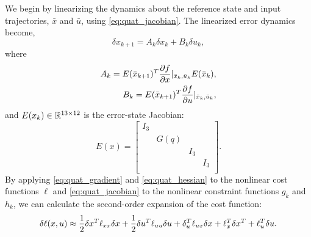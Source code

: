 \documentclass[../root.tex]{subfiles}
\begin{document}
    We begin by linearizing the dynamics about the reference state and input trajectories, $\bar{x}$ and $\bar{u}$, using
    \eqref{eq:quat_jacobian}. The linearized error dynamics become,
    \begin{equation} \label{eq:linearized_dynamics}
        \delta x_{k+1} = A_k \delta x_k + B_k \delta u_k ,
    \end{equation}
    where \begin{equation}
        \begin{aligned}
            A_k = E(\bar{x}_{k+1})^T \pdv{f}{x}|_{\bar{x}_k,\bar{u}_k} E(\bar{x}_k), \\
            B_k = E(\bar{x}_{k+1})^T \pdv{f}{u}|_{\bar{x}_k,\bar{u}_k},
        \end{aligned}
    \end{equation}
    and $E(x_k) \in \mathbb{R}^{13 \times 12}$ is the error-state Jacobian:
    \begin{equation} \label{eq:state_error_jacobian}
        E(x) = \begin{bmatrix}
            I_3 & & & \\
            & G(q) & & \\
            & & I_3 & \\
            & & & I_3 \\
        \end{bmatrix}\!.
    \end{equation}
    By applying \eqref{eq:quat_gradient} and \eqref{eq:quat_hessian} to the nonlinear
    cost functions $\ell$ and \eqref{eq:quat_jacobian} to the nonlinear constraint
    functions $g_k$ and $h_k$, we can calculate the second-order expansion of the cost 
    function:
    \begin{equation}
        \delta \ell(x,u) \approx  \frac{1}{2} \delta x^T \ell_{xx} \delta x
            + \frac{1}{2} \delta u^T \ell_{uu} \delta u + \delta_u^T \ell_{ux} \delta x 
            + \ell_x^T \delta x^T + \ell_u^T \delta u.
    \end{equation}
\end{document}
